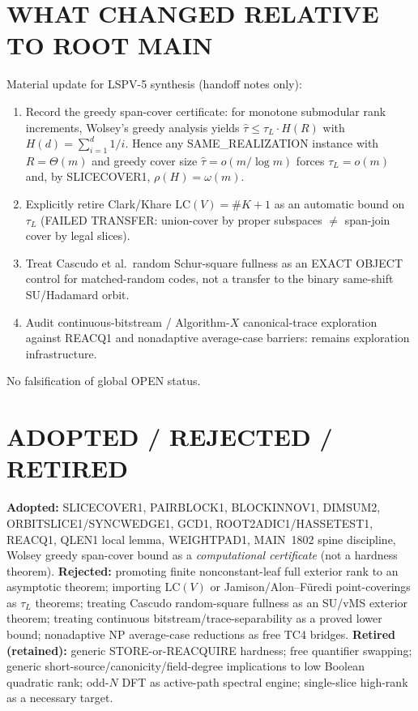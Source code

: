 \documentclass[11pt]{article}
\begin{document}
\section*{WHAT CHANGED RELATIVE TO ROOT MAIN}
Material update for LSPV-5 synthesis (handoff notes only):
\begin{enumerate}
\item Record the greedy span-cover certificate: for monotone submodular rank increments,
Wolsey's greedy analysis yields $\widehat\tau\le \tau_L\cdot H(R)$ with $H(d)=\sum_{i=1}^d 1/i$.
Hence any SAME\_REALIZATION instance with $R=\Theta(m)$ and greedy cover size
$\widehat\tau=o(m/\log m)$ forces $\tau_L=o(m)$ and, by SLICECOVER1,
$\rho(H)=\omega(m)$.
\item Explicitly retire Clark/Khare $\mathrm{LC}(V)=\#K+1$ as an automatic bound on $\tau_L$
(FAILED TRANSFER: union-cover by proper subspaces $\neq$ span-join cover by legal slices).
\item Treat Cascudo et al.\ random Schur-square fullness as an EXACT OBJECT control for
matched-random codes, not a transfer to the binary same-shift SU/Hadamard orbit.
\item Audit continuous-bitstream / Algorithm-$X$ canonical-trace exploration against
REACQ1 and nonadaptive average-case barriers: remains exploration infrastructure.
\end{enumerate}
No falsification of global OPEN status.

\section*{ADOPTED / REJECTED / RETIRED}
\textbf{Adopted:} SLICECOVER1, PAIRBLOCK1, BLOCKINNOV1, DIMSUM2, ORBITSLICE1/SYNCWEDGE1, GCD1,
ROOT2ADIC1/HASSETEST1, REACQ1, QLEN1 local lemma, WEIGHTPAD1, MAIN~1802 spine discipline,
Wolsey greedy span-cover bound as a \emph{computational certificate} (not a hardness theorem).
\textbf{Rejected:} promoting finite nonconstant-leaf full exterior rank to an asymptotic theorem;
importing $\mathrm{LC}(V)$ or Jamison/Alon--F\"uredi point-coverings as $\tau_L$ theorems;
treating Cascudo random-square fullness as an SU/vMS exterior theorem; treating continuous
bitstream/trace-separability as a proved lower bound; nonadaptive NP average-case reductions
as free TC4 bridges.
\textbf{Retired (retained):} generic STORE-or-REACQUIRE hardness; free quantifier swapping;
generic short-source/canonicity/field-degree implications to low Boolean quadratic rank;
odd-$N$ DFT as active-path spectral engine; single-slice high-rank as a necessary target.
\end{document}

